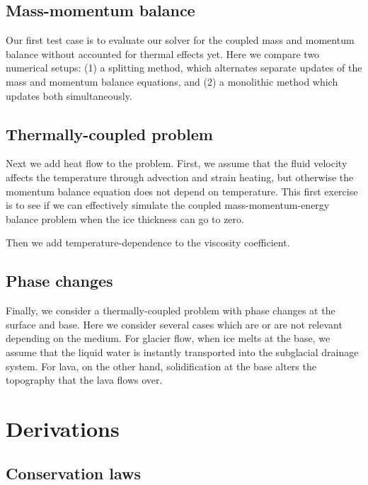 \documentclass{article}
\theoremstyle{definition}
\theoremstyle{plain}
\begin{document}
\subsection{Mass-momentum balance}

Our first test case is to evaluate our solver for the coupled mass and momentum balance without accounted for thermal effects yet.
Here we compare two numerical setups: (1) a splitting method, which alternates separate updates of the mass and momentum balance equations, and (2) a monolithic method which updates both simultaneously.

\subsection{Thermally-coupled problem}

Next we add heat flow to the problem.
First, we assume that the fluid velocity affects the temperature through advection and strain heating, but otherwise the momentum balance equation does not depend on temperature.
This first exercise is to see if we can effectively simulate the coupled mass-momentum-energy balance problem when the ice thickness can go to zero.

Then we add temperature-dependence to the viscosity coefficient.

\subsection{Phase changes}

Finally, we consider a thermally-coupled problem with phase changes at the surface and base.
Here we consider several cases which are or are not relevant depending on the medium.
For glacier flow, when ice melts at the base, we assume that the liquid water is instantly transported into the subglacial drainage system.
For lava, on the other hand, solidification at the base alters the topography that the lava flows over.


\pagebreak

\appendix
\section{Derivations}

\subsection{Conservation laws}
\end{document}

